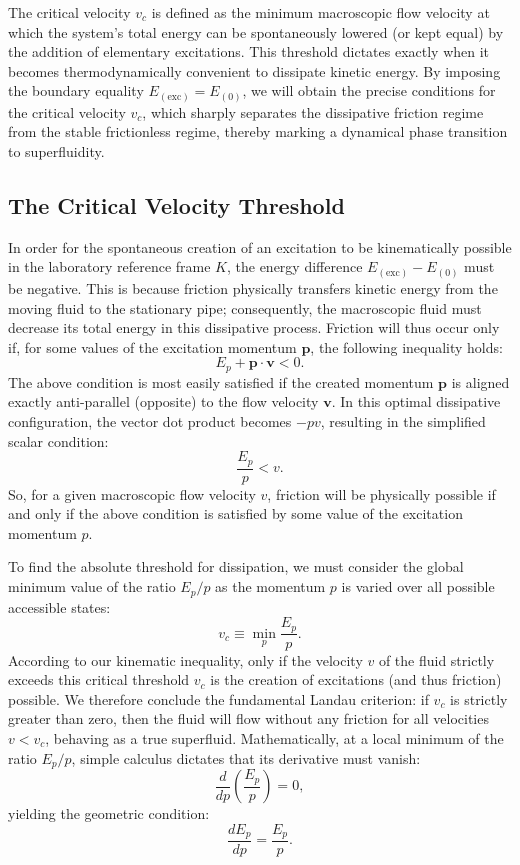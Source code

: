 The critical velocity \( v_c \) is defined as the minimum macroscopic flow velocity at which the system's total energy can be spontaneously lowered (or kept equal) by the addition of elementary excitations. This threshold dictates exactly when it becomes thermodynamically convenient to dissipate kinetic energy. By imposing the boundary equality \( E_{(\text{exc})} = E_{(0)} \), we will obtain the precise conditions for the critical velocity \( v_c \), which sharply separates the dissipative friction regime from the stable frictionless regime, thereby marking a dynamical phase transition to superfluidity.

\subsection{The Critical Velocity Threshold}

In order for the spontaneous creation of an excitation to be kinematically possible in the laboratory reference frame \( K \), the energy difference \( E_{(\text{exc})} - E_{(0)} \) must be negative. This is because friction physically transfers kinetic energy from the moving fluid to the stationary pipe; consequently, the macroscopic fluid must decrease its total energy in this dissipative process. Friction will thus occur only if, for some values of the excitation momentum \( \mathbf{p} \), the following inequality holds:
\[
    E_p + \mathbf{p} \cdot \mathbf{v} < 0.
\]
The above condition is most easily satisfied if the created momentum \( \mathbf{p} \) is aligned exactly anti-parallel (opposite) to the flow velocity \( \mathbf{v} \). In this optimal dissipative configuration, the vector dot product becomes \( -pv \), resulting in the simplified scalar condition:
\[
    \frac{E_p}{p} < v.
\]
So, for a given macroscopic flow velocity \( v \), friction will be physically possible if and only if the above condition is satisfied by some value of the excitation momentum \( p \).

To find the absolute threshold for dissipation, we must consider the global minimum value of the ratio \( E_p/p \) as the momentum \( p \) is varied over all possible accessible states:
\begin{equation} \label{eq:critical_velocity_definition}
    v_c \equiv \min_p \frac{E_p}{p}.
\end{equation}
According to our kinematic inequality, only if the velocity \( v \) of the fluid strictly exceeds this critical threshold \( v_c \) is the creation of excitations (and thus friction) possible. We therefore conclude the fundamental Landau criterion: if \( v_c \) is strictly greater than zero, then the fluid will flow without any friction for all velocities \( v < v_c \), behaving as a true superfluid. Mathematically, at a local minimum of the ratio \( E_p/p \), simple calculus dictates that its derivative must vanish:
\[
    \frac{d}{dp} \left( \frac{E_p}{p} \right) = 0,
\]
yielding the geometric condition:
\[
    \frac{dE_p}{dp} = \frac{E_p}{p}.
\]

